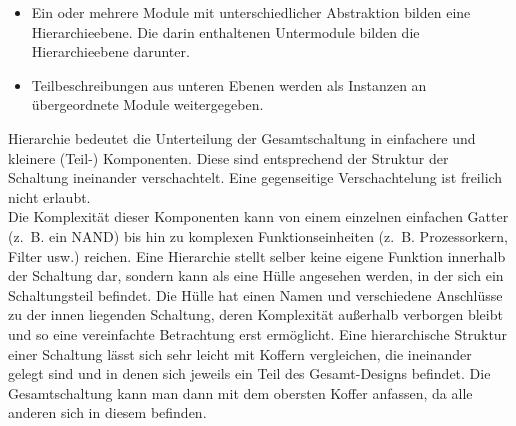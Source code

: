 \begin{itemize}
	\item Ein oder mehrere Module mit unterschiedlicher Abstraktion
	bilden eine Hierarchieebene. Die darin enthaltenen Untermodule
	bilden die Hierarchieebene darunter. 
	\item Teilbeschreibungen aus
	unteren Ebenen werden als Instanzen an übergeordnete Module
	weitergegeben.
\end{itemize}

Hierarchie bedeutet die Unterteilung der Gesamtschaltung in
einfachere und kleinere (Teil-) Komponenten. Diese sind
entsprechend der Struktur der Schaltung ineinander verschachtelt. Eine gegenseitige Verschachtelung ist freilich nicht erlaubt.\\
Die Komplexität dieser Komponenten kann von einem einzelnen
einfachen Gatter (z.~B. ein NAND) bis hin zu komplexen
Funktionseinheiten (z.~B. Prozessorkern, Filter usw.) reichen. Eine
Hierarchie stellt selber keine eigene Funktion innerhalb der
Schaltung dar, sondern kann als eine Hülle angesehen werden, in
der sich ein Schaltungsteil befindet. Die Hülle hat einen Namen
und verschiedene Anschlüsse zu der innen liegenden Schaltung,
deren Komplexität außerhalb verborgen bleibt und so eine
vereinfachte Betrachtung erst ermöglicht. Eine hierarchische
Struktur einer Schaltung lässt sich sehr leicht mit Koffern
vergleichen, die ineinander gelegt sind und in denen sich jeweils
ein Teil des Gesamt-Designs befindet. Die Gesamtschaltung kann man
dann mit dem obersten Koffer anfassen, da alle anderen sich in
diesem befinden.

